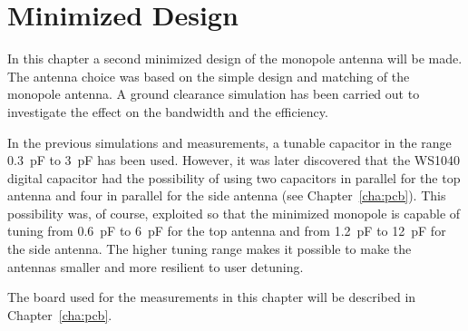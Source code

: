 \chapter{Minimized Design}
\label{cha_intro_5mm}
In this chapter a second minimized design of the monopole antenna will be made.
The antenna choice was based on the simple design and matching of the monopole antenna.
A ground clearance simulation has been carried out to investigate the effect on the bandwidth and the efficiency.

In the previous simulations and measurements, a tunable capacitor in the range \SI{0.3}{pF} to \SI{3}{pF} has been used. However, it was later discovered that the WS1040 digital capacitor had the possibility of using two capacitors in parallel for the top antenna and four in parallel for the side antenna (see Chapter~\ref{cha:pcb}). This possibility was, of course, exploited so that the minimized monopole is capable of tuning from \SI{0.6}{pF} to \SI{6}{pF} for the top antenna and from \SI{1.2}{pF} to \SI{12}{pF} for the side antenna. The higher tuning range makes it possible to make the antennas smaller and more resilient to user detuning.

The board used for the measurements in this chapter will be described in Chapter~\ref{cha:pcb}.
